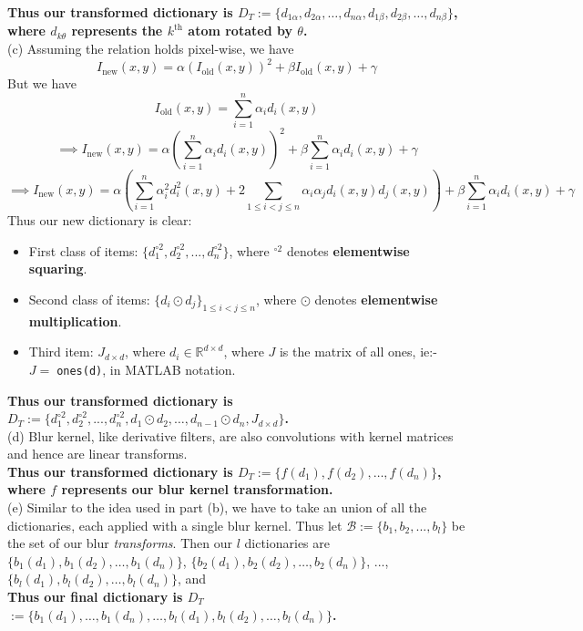 \documentclass[a4paper,14pt]{article}
\numberwithin{definition}{section}
\numberwithin{mytheorem}{subsection}
\begin{document}
\textbf{Thus our transformed dictionary is $D_T := \{d_{1\alpha}, d_{2\alpha}, \hdots, d_{n\alpha}, d_{1\beta}, d_{2\beta}, \hdots, d_{n\beta}\}$, where $d_{k\theta}$ represents the $k^{\mathrm{th}}$ atom rotated by $\theta$.}
\\
(c) Assuming the relation holds pixel-wise, we have
$$I_{\mathrm{new}}(x,y) = \alpha(I_{\mathrm{old}}(x,y))^2 + \beta I_{\mathrm{old}}(x,y) + \gamma$$
But we have
$$I_{\mathrm{old}}(x,y) = \sum^{n}_{i = 1}\alpha_id_i(x,y)$$
$$\implies I_{\mathrm{new}}(x,y) = \alpha(\sum_{i=1}^{n} \alpha_id_{i}(x,y))^2+\beta\sum_{i=1}^{n} \alpha_id_{i}(x,y)+\gamma $$
$$\implies I_{\mathrm{new}}(x,y) = \alpha(\sum_{i=1}^{n} \alpha_i^2d_{i}^2(x,y) + 2\sum_{1\leq i < j\leq n}\alpha_i\alpha_jd_{i}(x,y)d_{j}(x,y))+\beta\sum_{i=1}^{n} \alpha_id_{i}(x,y)+\gamma $$
Thus our new dictionary is clear:
\begin{itemize}
    \item First class of items: $\{d_1^{\circ 2}, d_2^{\circ 2}, ..., d_n^{\circ 2}\}$, where $^{\circ 2}$ denotes \textbf{elementwise squaring}.
    \item Second class of items: $\{d_i\odot d_j\}_{1\leq i < j\leq n}$, where $\odot$ denotes \textbf{elementwise multiplication}.
    \item Third item: $J_{d\times d}$, where $d_i\in\mathbb{R}^{d\times d}$, where $J$ is the matrix of all ones, ie:- $J = \;$\texttt{ones(d)}, in MATLAB notation.
\end{itemize}
\textbf{Thus our transformed dictionary is $D_T := \{d_1^{\circ 2}, d_2^{\circ 2}, ..., d_n^{\circ 2}, d_1\odot d_2,\hdots,d_{n-1}\odot d_{n},J_{d\times d}\}$.}
\\
(d) Blur kernel, like derivative filters, are also convolutions with kernel matrices and hence are linear transforms.\\
\textbf{Thus our transformed dictionary is $D_T := \{f(d_1), f(d_2), \hdots, f(d_n)\}$, where $f$ represents our blur kernel transformation.}
\\
(e) Similar to the idea used in part (b), we have to take an union of all the dictionaries, each applied with a single blur kernel. Thus let $\mathcal{B} := \{b_1, b_2, ..., b_l\}$ be the set of our blur \emph{transforms}. Then our $l$ dictionaries are $\{b_1(d_1), b_1(d_2), \hdots, b_1(d_n)\}$, $\{b_2(d_1), b_2(d_2), \hdots, b_2(d_n)\}$, ..., $\{b_l(d_1), b_l(d_2), \hdots, b_l(d_n)\}$, and \\
\textbf{Thus our final dictionary is $D_T$
 $:= \{b_1(d_1), \hdots, b_1(d_n), \hdots, b_l(d_1), b_l(d_2), \hdots, b_l(d_n)\}$.}\\
\end{document}

